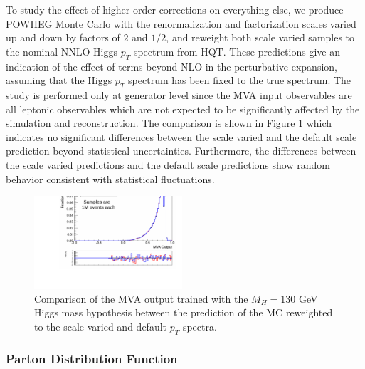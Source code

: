 To study the effect of higher order corrections on everything else, we produce
POWHEG Monte Carlo with the renormalization and factorization scales varied 
up and down by factors of $2$ and $1/2$, and reweight both scale varied samples
to the nominal NNLO Higgs $p_{T}$ spectrum from HQT. These predictions give 
an indication of the effect of terms beyond NLO in the perturbative expansion,
assuming that the Higgs $p_{T}$ spectrum has been fixed to the true spectrum. 
The study is performed only at generator level since the MVA input observables
are all leptonic observables which are not expected to be significantly 
affected by the simulation and reconstruction. The comparison is shown in 
Figure \ref{fig:signalshape_PtSpectrumScaleVariation_MVAOutput}
which indicates no significant differences between the scale varied and the default 
scale prediction beyond statistical uncertainties. Furthermore, the differences
between the scale varied predictions and the default scale predictions show
random behavior consistent with statistical fluctuations. 


\begin{figure}[!htbp]
\begin{center}
\includegraphics[width=0.49\textwidth]{figures/ShapeSystematics_HWW_MVA130_PowhegScaleVariationFixedPtSpectrum.pdf}
\caption{Comparison of the MVA output trained with the $M_{H}=130$ GeV Higgs mass hypothesis 
between the prediction of the MC reweighted to the scale varied and default $p_{T}$ spectra. 
}
\label{fig:signalshape_PtSpectrumScaleVariation_MVAOutput}
\end{center}
\end{figure}


\subsubsection{Parton Distribution Function}